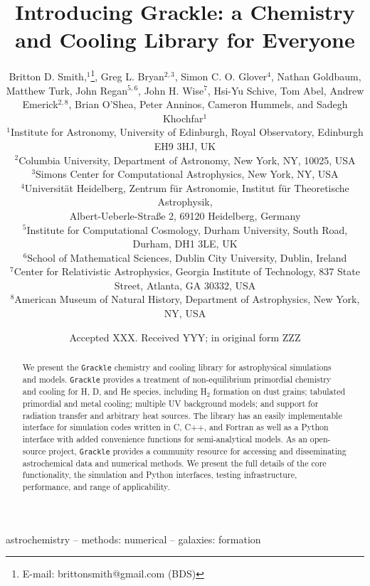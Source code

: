 \documentclass[a4paper,fleqn,usenatbib]{mnras}
\title[The Grackle]{Introducing Grackle: a Chemistry and Cooling
  Library for Everyone}
\author[B.D. Smith et al.]
       {Britton D. Smith,$^{1}$\thanks{E-mail: brittonsmith@gmail.com
           (BDS)},
        Greg L. Bryan$^{2,3}$,
        Simon C. O. Glover$^{4}$,
        Nathan Goldbaum, \newauthor
        Matthew Turk,
        John Regan$^{5,6}$,
        John H. Wise$^{7}$,
        Hsi-Yu Schive,
        Tom Abel, \newauthor
        Andrew Emerick$^{2,8}$,
        Brian O'Shea,
        Peter Anninos,
        Cameron Hummels, \newauthor
        and Sadegh Khochfar$^{1}$\\
$^{1}$Institute for Astronomy, University of Edinburgh, Royal
Observatory, Edinburgh EH9 3HJ, UK\\
$^{2}$Columbia University, Department of Astronomy, New York, NY,
10025, USA\\
$^{3}$Simons Center for Computational Astrophysics, New York, NY, USA\\
$^{4}$Universit\"{a}t Heidelberg, Zentrum f\"{u}r Astronomie, Institut f\"{u}r Theoretische Astrophysik, \\ Albert-Ueberle-Stra{\ss}e 2,
69120 Heidelberg, Germany\\
$^{5}$Institute for Computational Cosmology, Durham University, South Road, Durham, DH1 3LE, UK \\
$^{6}$School of Mathematical Sciences, Dublin City University, Dublin,
Ireland \\
$^{7}$Center for Relativistic Astrophysics, Georgia Institute of
Technology, 837 State Street, Atlanta, GA 30332, USA\\
$^{8}$American Museum of Natural History, Department of Astrophysics, New York, NY, USA
}
\date{Accepted XXX. Received YYY; in original form ZZZ}
\begin{document}
\label{firstpage}
\pagerange{\pageref{firstpage}--\pageref{lastpage}}
\maketitle

\begin{abstract}
We present the \texttt{Grackle} chemistry and cooling library for
astrophysical simulations and models.  \texttt{Grackle} provides
a treatment of non-equilibrium primordial chemistry and cooling for H, D, and He
species, including H$_{2}$ formation on dust grains; tabulated
primordial and metal cooling; multiple UV background models; and
support for radiation transfer and arbitrary heat sources.  The
library has an easily implementable interface for simulation codes
written in C, C++, and Fortran as well as a Python interface with
added convenience functions for semi-analytical models.  As an
open-source project, \texttt{Grackle} provides a community resource
for accessing and disseminating astrochemical data and numerical
methods.  We present the full details of the core functionality, the
simulation and Python interfaces, testing infrastructure, performance,
and range of applicability.
\end{abstract}

\begin{keywords}
astrochemistry -- methods: numerical -- galaxies: formation
\end{keywords}

















\footnotesize{
  
  
}

\bsp
\label{lastpage}
\end{document}
